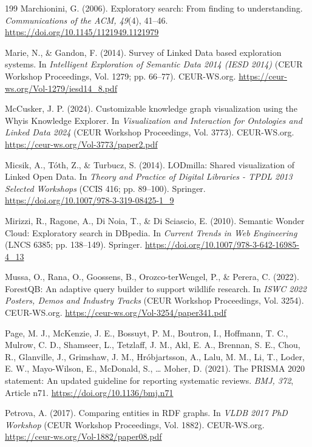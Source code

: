 \documentclass[manuscript,review,screen]{acmart}
\begin{document}
\begin{thebibliography}{199}
 Marchionini, G. (2006). Exploratory search: From finding to understanding. \textit{Communications of the ACM, 49}(4), 41--46. \url{https://doi.org/10.1145/1121949.1121979}

 Marie, N., \& Gandon, F. (2014). Survey of Linked Data based exploration systems. In \textit{Intelligent Exploration of Semantic Data 2014 (IESD 2014)} (CEUR Workshop Proceedings, Vol. 1279; pp. 66--77). CEUR-WS.org. \url{https://ceur-ws.org/Vol-1279/iesd14_8.pdf}

 McCusker, J. P. (2024). Customizable knowledge graph visualization using the Whyis Knowledge Explorer. In \textit{Visualization and Interaction for Ontologies and Linked Data 2024} (CEUR Workshop Proceedings, Vol. 3773). CEUR-WS.org. \url{https://ceur-ws.org/Vol-3773/paper2.pdf}

 Micsik, A., T\'{o}th, Z., \& Turbucz, S. (2014). LODmilla: Shared visualization of Linked Open Data. In \textit{Theory and Practice of Digital Libraries - TPDL 2013 Selected Workshops} (CCIS 416; pp. 89--100). Springer. \url{https://doi.org/10.1007/978-3-319-08425-1_9}

 Mirizzi, R., Ragone, A., Di Noia, T., \& Di Sciascio, E. (2010). Semantic Wonder Cloud: Exploratory search in DBpedia. In \textit{Current Trends in Web Engineering} (LNCS 6385; pp. 138--149). Springer. \url{https://doi.org/10.1007/978-3-642-16985-4_13}

 Mussa, O., Rana, O., Goossens, B., Orozco-terWengel, P., \& Perera, C. (2022). ForestQB: An adaptive query builder to support wildlife research. In \textit{ISWC 2022 Posters, Demos and Industry Tracks} (CEUR Workshop Proceedings, Vol. 3254). CEUR-WS.org. \url{https://ceur-ws.org/Vol-3254/paper341.pdf}

 Page, M. J., McKenzie, J. E., Bossuyt, P. M., Boutron, I., Hoffmann, T. C., Mulrow, C. D., Shamseer, L., Tetzlaff, J. M., Akl, E. A., Brennan, S. E., Chou, R., Glanville, J., Grimshaw, J. M., Hr\'{o}bjartsson, A., Lalu, M. M., Li, T., Loder, E. W., Mayo-Wilson, E., McDonald, S., \ldots{} Moher, D. (2021). The PRISMA 2020 statement: An updated guideline for reporting systematic reviews. \textit{BMJ, 372}, Article n71. \url{https://doi.org/10.1136/bmj.n71}

 Petrova, A. (2017). Comparing entities in RDF graphs. In \textit{VLDB 2017 PhD Workshop} (CEUR Workshop Proceedings, Vol. 1882). CEUR-WS.org. \url{https://ceur-ws.org/Vol-1882/paper08.pdf}


\end{thebibliography}
\end{document}
